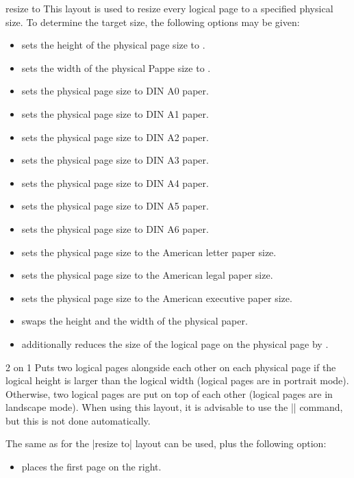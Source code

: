 \begin{pgflayout}{resize to}
    This layout is used to resize every logical page to a specified physical
    size. To determine the target size, the following options may be given:
    \begin{itemize}
        \item {} sets the height of
            the physical page size to .
        \item {} sets the width of
            the physical Pappe size to .
        \item {} sets the physical page size to DIN A0 paper.
        \item {} sets the physical page size to DIN A1 paper.
        \item {} sets the physical page size to DIN A2 paper.
        \item {} sets the physical page size to DIN A3 paper.
        \item {} sets the physical page size to DIN A4 paper.
        \item {} sets the physical page size to DIN A5 paper.
        \item {} sets the physical page size to DIN A6 paper.
        \item {} sets the physical page size to the
            American letter paper size.
        \item {} sets the physical page size to the
            American legal paper size.
        \item {} sets the physical page size to the
            American executive paper size.
        \item {} swaps the height and the width of the
            physical paper.
        \item {} additionally reduces the
            size of the logical page on the physical page by .
    \end{itemize}
\end{pgflayout}

\begin{pgflayout}{2 on 1}
    Puts two logical pages alongside each other on each physical page if the
    logical height is larger than the logical width (logical pages are in
    portrait mode). Otherwise, two logical pages are put on top of each other
    (logical pages are in landscape mode). When using this layout, it is
    advisable to use the |\nofiles| command, but this is not done
    automatically.

    The same  as for the |resize to| layout can be used, plus the
    following option:
    \begin{itemize}
        \item {} places the first page on the
            right.
    \end{itemize}
\end{pgflayout}

